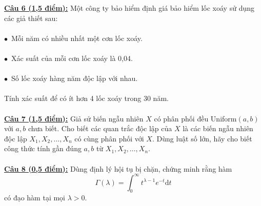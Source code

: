 \documentclass[10pt, a4paper]{article}
\begin{document}
\color{red}\underline{\textbf{Câu 6 (1,5 điểm):}} \color{black}Một công ty bảo hiểm định giá bảo hiểm lốc xoáy sử dụng các giả thiết sau:\\\\
$\bullet$~Mỗi năm có nhiều nhất một cơn lốc xoáy.\\\\
$\bullet$~Xác suất của mỗi cơn lốc xoáy là 0,04.\\\\
$\bullet$~Số lốc xoáy hàng năm độc lập với nhau.\\\\
Tính xác suất để có ít hơn 4 lốc xoáy trong 30 năm.\\\\
\color{red}\underline{\textbf{Câu 7 (1,5 điểm):}} \color{black}Giả sử biến ngẫu nhiên $X$ có phân phối đều Uniform$(a,b)$ với $a,b$ chưa biết. Cho biết các quan trắc độc lập của $X$ là các biến ngẫu nhiên độc lập $X_1,X_2,\dots,X_n$ có cùng phân phối với $X$. Dùng luật số lớn, hãy cho biết công thức tính gần đúng $a,b$ từ $X_1,X_2,\dots,X_n$.\\\\
\color{red}\underline{\textbf{Câu 8 (0,5 điểm):}} \color{black}Dùng định lý hội tụ bị chặn, chứng minh rằng hàm $$\Gamma(\lambda)=\displaystyle\int_0^\infty t^{\lambda-1}e^{-t}\text{d}t$$ có đạo hàm tại mọi $\lambda>0$.

\newpage
\end{document}

